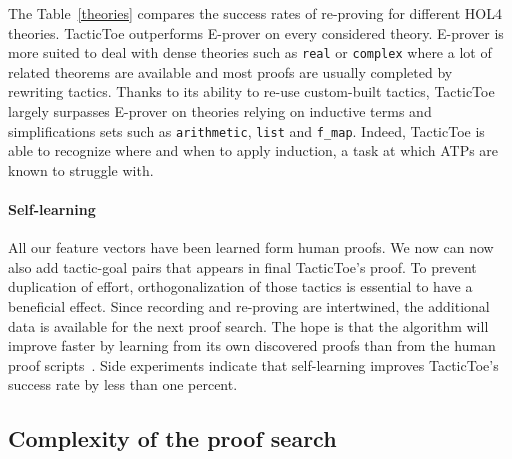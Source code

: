 \documentclass[runningheads,a4paper,draft]{svjour3}
\def\holfour{\textsf{HOL4}\xspace}
\def\eprover{\textsf{E-prover}\xspace}
\def\tactictoe{\textsf{TacticToe}\xspace}
\begin{document}
The Table~\ref{theories} compares the success rates of re-proving for different
\holfour theories. \tactictoe outperforms \eprover on every
considered theory.
\eprover is more suited to deal with dense theories such as
\texttt{real} or \texttt{complex} where a lot of related theorems are available
and most proofs are usually completed by rewriting tactics. Thanks to its 
ability to re-use custom-built tactics, \tactictoe 
largely surpasses \eprover on theories relying on inductive terms and 
simplifications sets such as \texttt{arithmetic}, \texttt{list} 
and \texttt{f\_map}. Indeed, \tactictoe is able to recognize where and when to 
apply induction, a task at which ATPs are known to struggle with.


\paragraph{Self-learning}
All our feature vectors have been learned form human proofs. We now can now
also add tactic-goal pairs that appears in final \tactictoe's proof. To prevent
duplication of effort, orthogonalization of those
tactics is essential to have a beneficial effect.
Since recording and re-proving are intertwined, the additional data is
available for the next proof search.
The hope is that the algorithm will improve faster by learning from its own
discovered proofs than from the human proof
scripts~\cite{DBLP:conf/cade/Urban07}. Side experiments indicate that
self-learning improves \tactictoe's success rate by less than one percent.



\subsection{Complexity of the proof search}
\end{document}
